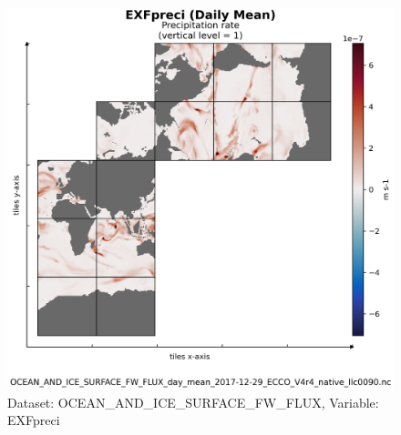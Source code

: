\begin{figure}[H]
\centering
\includegraphics[scale=0.55]{../images/plots/v4r4/native_plots/Ocean_and_Sea-Ice_Surface_Freshwater_Fluxes/EXFpreci.png}
\caption{Dataset: OCEAN\_AND\_ICE\_SURFACE\_FW\_FLUX, Variable: EXFpreci}
\label{tab:table-OCEAN_AND_ICE_SURFACE_FW_FLUX_EXFpreci-Plot}
\end{figure}
\newpage
\pagebreak
